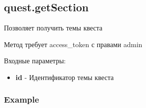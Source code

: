 \subsection{quest.getSection}

Позволяет получить темы квеста

Метод требует access\_token с правами admin

Входные параметры:
\begin{itemize}
  \item \textbf{id} - Идентификатор темы квеста
\end{itemize}

\subsubsection{Example}
\begin{Verbatim}[frame=single]

\end{Verbatim}